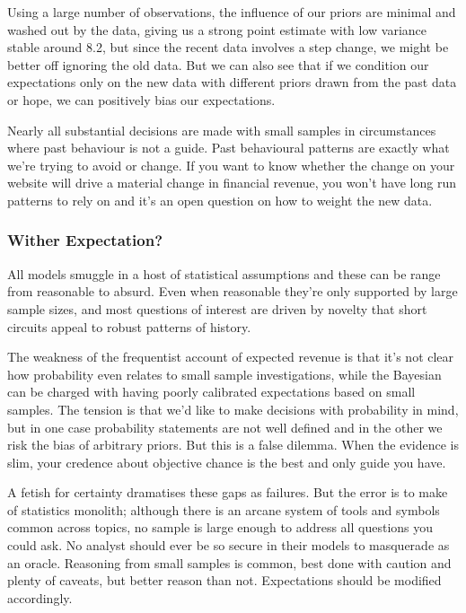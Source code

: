 \documentclass[10pt,a4paper,notitlepage, twocolumn]{article}
\begin{document}
Using a large number of observations, the influence of our priors are minimal and washed out by the data, giving us a strong point estimate with low variance stable around 8.2, but since the recent data involves a step change, we might be better off ignoring the old data. But we can also see that if we condition our expectations only on the new data with different priors drawn from the past data or hope, we can positively bias our expectations. 

Nearly all substantial decisions are made with small samples in circumstances where past behaviour is not a guide. Past behavioural patterns are exactly what we're trying to avoid or change. If you want to know whether the change on your website will drive a material change in financial revenue, you won't have long run patterns to rely on and it's an open question on how to weight the new data. 

\subsubsection*{Wither Expectation?}
All models smuggle in a host of statistical assumptions and these can be range from reasonable to absurd. Even when reasonable they're only supported by large sample sizes, and most questions of interest are driven by novelty that short circuits appeal to robust patterns of history. 

The weakness of the frequentist account of expected revenue is that it's not clear how probability even relates to small sample investigations, while the Bayesian can be charged with having poorly calibrated expectations based on small samples. The tension is that we'd like to make decisions with probability in mind, but in one case probability statements are not well defined and in the other we risk the bias of arbitrary priors. But this is a false dilemma. When the evidence is slim, your credence about objective chance is the best and only guide you have.

A fetish for certainty dramatises these gaps as failures. But the error is to make of statistics monolith; although there is an arcane system of tools and symbols common across topics, no sample is large enough to address all questions you could ask. No analyst should ever be so secure in their models to masquerade as an oracle. Reasoning from small samples is common, best done with caution and plenty of caveats, but better reason than not. Expectations should be modified accordingly.
\end{document}
